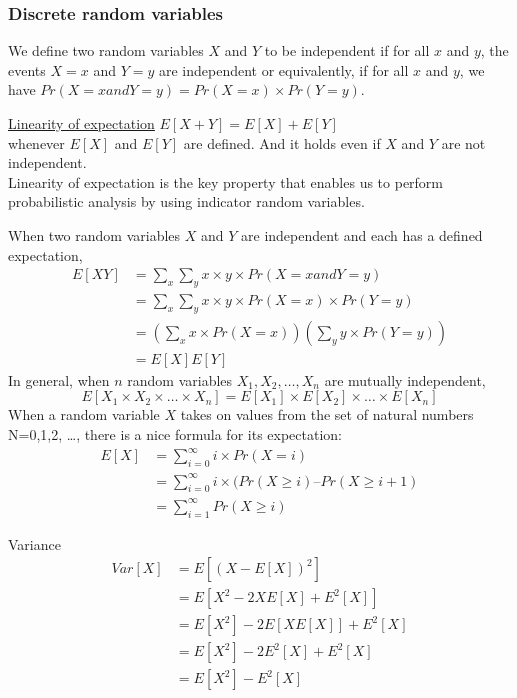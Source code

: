 \documentclass{article}
\begin{document}
\subsubsection{Discrete random variables}
We define two random variables $X$ and $Y$ to be independent if for all $x$ and $y$, the events $X=x$ and $Y=y$ are independent or equivalently, if for all $x$ and $y$, we have $Pr(X=x and Y=y)=Pr(X=x) \times Pr(Y=y)$.

\underline{Linearity of expectation}
$E[X+Y]=E[X]+E[Y]$ \\
whenever $E[X]$ and $E[Y]$ are defined. And it holds even if $X$ and $Y$ are not independent.\\
Linearity of expectation is the key property that enables us to perform probabilistic analysis by using indicator random variables.

When two random variables $X$ and $Y$ are independent and each has a defined expectation,
\begin{equation}
\begin{aligned}
E[XY]
&=\sum_x\sum_y x \times y \times Pr(X=x and Y=y) \\
&=\sum_x\sum_y x \times y \times Pr(X=x) \times Pr(Y=y)\\
&=(\sum_x x \times Pr(X=x))(\sum_y y \times Pr(Y=y))\\
&=E[X]E[Y]
\end{aligned}
\end{equation}
In general, when $n$ random variables $X_1, X_2, \ldots, X_n$ are mutually independent,
$$
E[X_1 \times X_2 \times \ldots \times X_n]=E[X_1] \times E[X_2] \times \ldots \times E[X_n]
$$
When a random variable $X$ takes on values from the set of natural numbers N={0,1,2, \ldots}, there is a nice formula for its expectation:
\begin{equation}
\begin{aligned}
E[X]
&=\sum_{i=0}^{\infty} i \times Pr(X=i)\\
&=\sum_{i=0}^{\infty} i \times (Pr(X \geq i) – Pr(X \geq i+1)\\
&=\sum_{i=1}^{\infty} Pr(X \geq i)
\end{aligned}
\end{equation}

Variance
\begin{equation}
\begin{aligned}
Var[X]
&=E[(X-E[X])^2] \\
&=E[X^2-2XE[X]+E^2[X]]\\
&=E[X^2]-2E[XE[X]]+E^2[X]\\
&=E[X^2]-2E^2[X]+E^2[X]\\
&=E[X^2]-E^2[X]
\end{aligned}
\end{equation}
\end{document}
